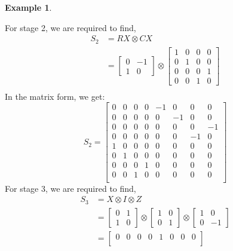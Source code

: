 \documentclass[12pt, oneside]{book}
\theoremstyle{definition}
\theoremstyle{definition}
\newtheorem{example}{Example}[section]
\theoremstyle{remark}
\begin{document}
\begin{example}
\begin{enumerate}
\[        \]
        For stage 2, we are required to find,
        \begin{align*}
            S_2 &= RX \otimes CX\\
            &= \begin{bmatrix} 0 & -1 \\ 1 & 0 \end{bmatrix} \otimes \begin{bmatrix} 1 & 0 & 0 & 0 \\
            0 & 1 & 0 & 0 \\
            0 & 0 & 0 & 1 \\
            0 & 0 & 1 & 0 \end{bmatrix} \\
        \end{align*}
        In the matrix form, we get:
        \[
            S_2=\begin{bmatrix}
                0 & 0 & 0 & 0 & -1 & 0 & 0 & 0 \\
                0 & 0 & 0 & 0 & 0 & -1 & 0 & 0 \\
                0 & 0 & 0 & 0 & 0 & 0 & 0 & -1 \\
                0 & 0 & 0 & 0 & 0 & 0 & -1 & 0 \\
                1 & 0 & 0 & 0 & 0 & 0 & 0 & 0 \\
                0 & 1 & 0 & 0 & 0 & 0 & 0 & 0 \\
                0 & 0 & 0 & 1 & 0 & 0 & 0 & 0 \\
                0 & 0 & 1 & 0 & 0 & 0 & 0 & 0 \\
            \end{bmatrix}
        \]
        For stage 3, we are required to find,
        \begin{align*}
            S_3 &= X \otimes I \otimes Z \\
            &= \begin{bmatrix} 0 & 1 \\ 1 & 0 \end{bmatrix} \otimes \begin{bmatrix} 1 & 0 \\ 0 & 1 \end{bmatrix} \otimes \begin{bmatrix} 1 & 0 \\ 0 & -1 \end{bmatrix} \\
            &= \begin{bmatrix} 0 & 0 & 0 & 0 & 1 & 0 & 0 & 0 \\

\end{bmatrix}
\end{align*}
\end{enumerate}
\end{example}
\end{document}
